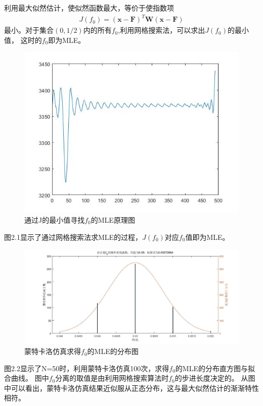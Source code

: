 \documentclass[fontset=windows]{article}
\numberwithin{figure}{section}
\begin{document}
利用最大似然估计，使似然函数最大，等价于使指数项
\begin{align*}
	J(f_0)=(\mathbf{x}-\mathbf{F})^T\mathbf{W}(\mathbf{x}-\mathbf{F})
\end{align*}
最小。对于集合\((0,1/2)\)内的所有\(f_0\),利用网格搜索法，可以求出\(J(f_0)\)的最小值，
这时的\(f_0\)即为MLE。

\begin{figure}[H]
	\centering
	\includegraphics[scale=0.6]{untitled2-2.jpg}
	\caption{通过J的最小值寻找\(f_0\)的MLE原理图}
	\label{2.1}
\end{figure}

图2.1显示了通过网格搜索法求MLE的过程，\(J(f_0)\)对应\(f_0\)值即为MLE。

\begin{figure}[H]
	\centering
	\includegraphics[scale=0.4]{untitled2-1.jpg}
	\caption{蒙特卡洛仿真求得\(f_0\)的MLE的分布图}
	\label{2.2}
\end{figure}

图2.2显示了N=50时，利用蒙特卡洛仿真100次，求得\(f_0\)的MLE的分布直方图与拟合曲线。
图中\(f_0\)分离的取值是由利用网格搜索算法时\(f_0\)的步进长度决定的。
从图中可以看出，蒙特卡洛仿真结果近似服从正态分布，这与最大似然估计的渐渐特性相符。
\end{document}
